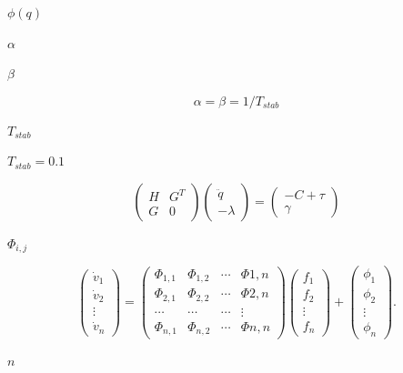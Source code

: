 \documentclass{article}
\begin{document}
$\phi (q)$
\pagebreak

$\alpha$
\pagebreak

$\beta$
\pagebreak

\[
  \alpha = \beta = 1 / T_\textit{stab}
  \]
\pagebreak

$T_\textit{stab}$
\pagebreak

$T_\textit{stab} = 0.1$
\pagebreak

\[
\left(
  \begin{array}{cc}
    H & G^T \\
    G & 0
  \end{array}
\right)
\left(
  \begin{array}{c}
    \ddot{q} \\
    -\lambda
  \end{array}
\right)
=
\left(
  \begin{array}{c}
    -C + \tau \\
    \gamma
  \end{array}
\right)
  \]
\pagebreak

$\Phi_{i,j}$
\pagebreak

\[
\left(
  \begin{array}{c}
    \dot{v}_1 \\
    \dot{v}_2 \\
    \vdots \\
    \dot{v}_n
  \end{array}
\right)
=
\left(
  \begin{array}{cccc}
    \Phi_{1,1} & \Phi_{1,2} & \cdots & \Phi{1,n} \\
    \Phi_{2,1} & \Phi_{2,2} & \cdots & \Phi{2,n} \\
    \cdots & \cdots & \cdots & \vdots \\
    \Phi_{n,1} & \Phi_{n,2} & \cdots & \Phi{n,n} 
  \end{array}
\right)
\left(
  \begin{array}{c}
    f_1 \\
    f_2 \\
    \vdots \\
    f_n
  \end{array}
\right)
+ 
\left(
  \begin{array}{c}
  \phi_1 \\
  \phi_2 \\
  \vdots \\
  \phi_n
  \end{array}
\right).
\]
\pagebreak

$n$
\pagebreak
\end{document}
